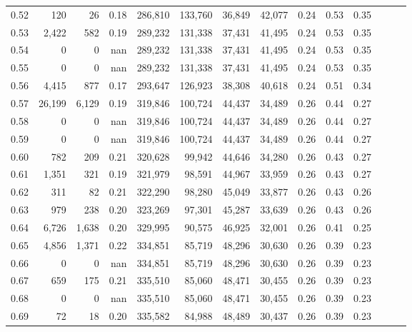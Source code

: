 \begin{tabular}{rrrrrrrrrrrrrr}
0.52 &     120 &     26 &  0.18 &  286,810 &  133,760 &  36,849 &  42,077 &  0.24 &  0.53 &      0.35 \\
0.53 &   2,422 &    582 &  0.19 &  289,232 &  131,338 &  37,431 &  41,495 &  0.24 &  0.53 &      0.35 \\
0.54 &       0 &      0 &   nan &  289,232 &  131,338 &  37,431 &  41,495 &  0.24 &  0.53 &      0.35 \\
0.55 &       0 &      0 &   nan &  289,232 &  131,338 &  37,431 &  41,495 &  0.24 &  0.53 &      0.35 \\
0.56 &   4,415 &    877 &  0.17 &  293,647 &  126,923 &  38,308 &  40,618 &  0.24 &  0.51 &      0.34 \\
0.57 &  26,199 &  6,129 &  0.19 &  319,846 &  100,724 &  44,437 &  34,489 &  0.26 &  0.44 &      0.27 \\
0.58 &       0 &      0 &   nan &  319,846 &  100,724 &  44,437 &  34,489 &  0.26 &  0.44 &      0.27 \\
0.59 &       0 &      0 &   nan &  319,846 &  100,724 &  44,437 &  34,489 &  0.26 &  0.44 &      0.27 \\
0.60 &     782 &    209 &  0.21 &  320,628 &   99,942 &  44,646 &  34,280 &  0.26 &  0.43 &      0.27 \\
0.61 &   1,351 &    321 &  0.19 &  321,979 &   98,591 &  44,967 &  33,959 &  0.26 &  0.43 &      0.27 \\
0.62 &     311 &     82 &  0.21 &  322,290 &   98,280 &  45,049 &  33,877 &  0.26 &  0.43 &      0.26 \\
0.63 &     979 &    238 &  0.20 &  323,269 &   97,301 &  45,287 &  33,639 &  0.26 &  0.43 &      0.26 \\
0.64 &   6,726 &  1,638 &  0.20 &  329,995 &   90,575 &  46,925 &  32,001 &  0.26 &  0.41 &      0.25 \\
0.65 &   4,856 &  1,371 &  0.22 &  334,851 &   85,719 &  48,296 &  30,630 &  0.26 &  0.39 &      0.23 \\
0.66 &       0 &      0 &   nan &  334,851 &   85,719 &  48,296 &  30,630 &  0.26 &  0.39 &      0.23 \\
0.67 &     659 &    175 &  0.21 &  335,510 &   85,060 &  48,471 &  30,455 &  0.26 &  0.39 &      0.23 \\
0.68 &       0 &      0 &   nan &  335,510 &   85,060 &  48,471 &  30,455 &  0.26 &  0.39 &      0.23 \\
0.69 &      72 &     18 &  0.20 &  335,582 &   84,988 &  48,489 &  30,437 &  0.26 &  0.39 &      0.23 \\

\end{tabular}
